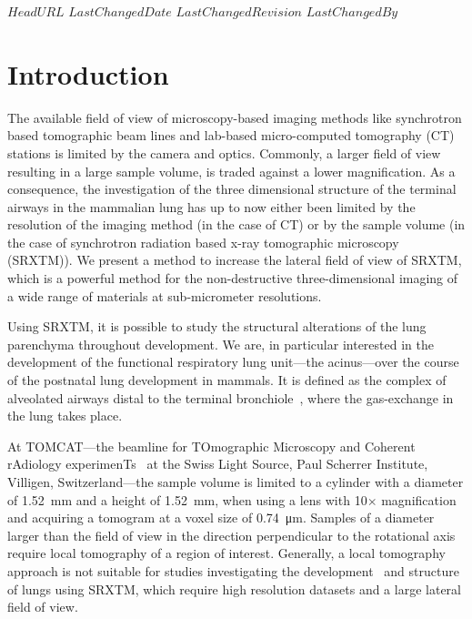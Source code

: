 \svnidlong
{$HeadURL$}
{$LastChangedDate$}
{$LastChangedRevision$}
{$LastChangedBy$}
%
\section{Introduction}

The available field of view of microscopy-based imaging methods like synchrotron based tomographic beam lines and lab-based micro-computed tomography (\micro CT) stations is limited by the camera and optics. Commonly, a larger field of view resulting in a large sample volume, is traded against a lower magnification. As a consequence, the investigation of the three dimensional structure of the terminal airways in the mammalian lung has up to now either been limited by the resolution of the imaging method (in the case of \micro CT) or by the sample volume (in the case of synchrotron radiation based x-ray tomographic microscopy (SRXTM)). We present a method to increase the lateral field of view of SRXTM, which is a powerful method for the non-destructive three-dimensional imaging of a wide range of materials at sub-micrometer resolutions.

Using SRXTM, it is possible to study the structural alterations of the lung parenchyma throughout development. We are, in particular interested in the development of the functional respiratory lung unit---the acinus---over the course of the postnatal lung development in mammals. It is defined as the complex of alveolated airways distal to the terminal bronchiole~\cite{Rodriguez1987}, where the gas-exchange in the lung takes place.

At TOMCAT---the beamline for TOmographic Microscopy and Coherent rAdiology experimenTs~\cite{Stampanoni2007} at the Swiss Light Source, Paul Scherrer Institute, Villigen, Switzerland---the sample volume is limited to a cylinder with a diameter of \SI{1.52}{\milli\meter} and a height of \SI{1.52}{\milli\meter}, when using a lens with 10$\times$ magnification and acquiring a tomogram at a voxel size of \SI{0.74}{\micro\meter}. Samples of a diameter larger than the field of view in the direction perpendicular to the rotational axis require local tomography of a region of interest. Generally, a local tomography approach is not suitable for studies investigating the development~\cite{Schittny2008,Mund2008,Haberthuer2009c} and structure~\cite{Tsuda2008} of lungs using SRXTM, which require high resolution datasets and a large lateral field of view.

